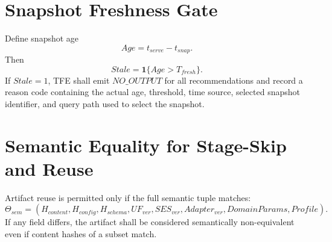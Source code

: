 \section{Snapshot Freshness Gate}

Define snapshot age
\[
Age = t_{serve}-t_{snap}.
\]
Then
\[
Stale = \mathbf{1}\{Age > T_{fresh}\}.
\]
If $Stale=1$, TFE shall emit $NO\_OUTPUT$ for all recommendations and record a reason code containing the actual age, threshold, time source, selected snapshot identifier, and query path used to select the snapshot.

\section{Semantic Equality for Stage-Skip and Reuse}

Artifact reuse is permitted only if the full semantic tuple matches:
\[
\Theta_{sem}=(H_{content},H_{config},H_{schema},UF_{ver},SES_{ver},Adapter_{ver},DomainParams,Profile).
\]
If any field differs, the artifact shall be considered semantically non-equivalent even if content hashes of a subset match.
